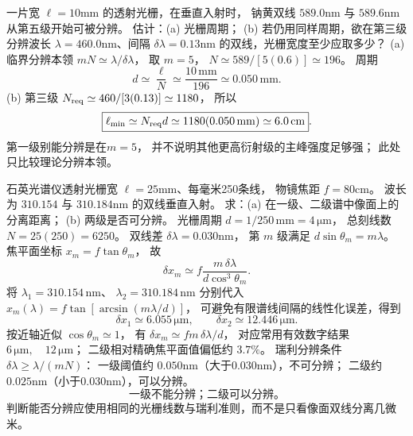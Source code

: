 一片宽
$\ell=10$mm 的透射光栅，在垂直入射时，
钠黄双线 $589.0$nm 与 $589.6$nm 从第五级开始可被分辨。
估计：(a) 光栅周期；
(b) 若仍用同样周期，欲在第三级分辨波长
$\lambda=460.0$nm、间隔
$\delta\lambda=0.13$nm 的双线，光栅宽度至少应取多少？
\exsolution
(a) 临界分辨本领
$mN\simeq\lambda/\delta\lambda$，
取 $m=5$，
$N\simeq589/[5(0.6)]\simeq196$。
周期
\[
\boxed{d\simeq\frac{\ell}{N}
\simeq\frac{10\,\mathrm{mm}}{196}
\simeq0.050\,\mathrm{mm}}.
\]
(b) 第三级
$N_{\rm req}\simeq460/[3(0.13)]
\simeq1180$，
所以
\[
\boxed{\ell_{\min}\simeq N_{\rm req}d
\simeq1180(0.050\,\mathrm{mm})
\simeq6.0\,\mathrm{cm}}.
\]
\excheck 第一级别能分辨是在$m=5$，
并不说明其他更高衍射级的主峰强度足够强；
此处只比较理论分辨本领。

石英光谱仪透射光栅宽
$\ell=25$mm、每毫米250条线，
物镜焦距
$f=80$cm。
波长为 $310.154$ 与
$310.184$nm 的双线垂直入射。
求：(a) 在一级、二级谱中像面上的分离距离；
(b) 两级是否可分辨。
\exsolution
光栅周期
$d=1/250\,\mathrm{mm}=4\,\mathrm{\mu m}$，
总刻线数
$N=25(250)=6250$。
双线差
$\delta\lambda=0.030$nm，
第 $m$ 级满足
$d\sin\theta_m=m\lambda$。
焦平面坐标 $x_m=f\tan\theta_m$，
故
\[
\delta x_m\simeq
f\frac{m\,\delta\lambda}{d\cos^3\theta_m}.
\]
将 $\lambda_1=310.154\,\mathrm{nm}$、
$\lambda_2=310.184\,\mathrm{nm}$ 分别代入
$x_m(\lambda)=f\tan[\arcsin(m\lambda/d)]$，
可避免有限谱线间隔的线性化误差，得到
\[
 \boxed{\delta x_1\simeq6.055\,\mathrm{\mu m}},
 \qquad
 \boxed{\delta x_2\simeq12.446\,\mathrm{\mu m}}.
\]
按近轴近似 $\cos\theta_m\simeq1$，
有 $\delta x_m\simeq fm\,\delta\lambda/d$，
对应常用有效数字结果
$\boxed{6\,\mathrm{\mu m},\quad12\,\mathrm{\mu m}}$；
二级相对精确焦平面值偏低约 $3.7\%$。
瑞利分辨条件
$\delta\lambda\ge\lambda/(mN)$：
一级阈值约 $0.050$nm（大于0.030nm），不可分辨；
二级约 $0.025$nm（小于0.030nm），可以分辨。
\[
\boxed{\text{一级不能分辨；二级可以分辨。}}
\]
\excheck 判断能否分辨应使用相同的光栅线数与瑞利准则，而不是只看像面双线分离几微米。
